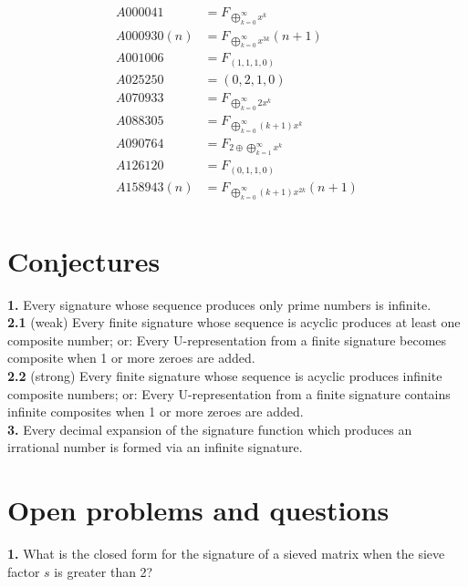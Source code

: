 \documentclass{article}
\begin{document}
\begin{align*}
A000041 &= F_{\displaystyle \bigoplus_{k=0}^{\infty} x^k}\\
A000930(n) &= F_{\displaystyle \bigoplus_{k=0}^{\infty} x^{3k}}(n+1)\\
A001006 &= F_{(1, 1, 1, 0)}\\
A025250 &= (0, 2, 1, 0)\\
A070933 &= F_{\displaystyle \bigoplus_{k=0}^{\infty} 2x^k}\\
A088305 &= F_{\displaystyle \bigoplus_{k=0}^{\infty} (k+1)x^k}\\
A090764 &= F_{2 \oplus \displaystyle \bigoplus_{k=1}^{\infty} x^k}\\
A126120 &= F_{(0, 1, 1, 0)}\\
A158943(n) &= F_{\displaystyle \bigoplus_{k=0}^{\infty} (k+1)x^{2k}}(n+1)\\
\end{align*}

\pagebreak

\section{Conjectures}

\textbf{1.} Every signature whose sequence produces only prime numbers is infinite.\\

\noindent \textbf{2.1} (weak) Every finite signature whose sequence is acyclic produces at least one composite number; or: Every U-representation from a finite signature becomes composite when 1 or more zeroes are added.\\

\noindent \textbf{2.2} (strong) Every finite signature whose sequence is acyclic produces infinite composite numbers; or: Every U-representation from a finite signature contains infinite composites when 1 or more zeroes are added.\\

\noindent \textbf{3.} Every decimal expansion of the signature function which produces an irrational number is formed via an infinite signature.

\section{Open problems and questions}

\textbf{1.} What is the closed form for the signature of a sieved matrix when the sieve factor $s$ is greater than 2?\\
\end{document}
